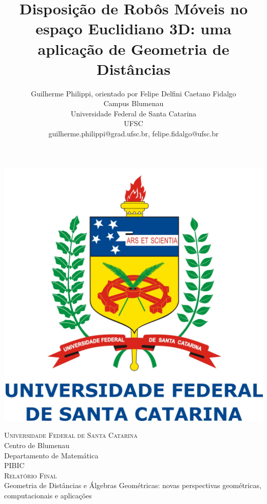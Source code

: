 \documentclass[a4paper,12pt]{article}
\title{Disposição de Robôs Móveis no espaço Euclidiano 3D: uma aplicação de Geometria de Distâncias}
\author{Guilherme Philippi\Mark{*}, orientado por Felipe Delfini Caetano Fidalgo\Mark{\dagger}\\Campus Blumenau\\Universidade Federal de Santa Catarina\\UFSC
	\\guilherme.philippi@grad.ufsc.br\Mark{*}, felipe.fidalgo@ufsc.br\Mark{\dagger}}
\begin{document}
	\begin{titlepage}
		\newcommand{\HRule}{\rule{\linewidth}{0.5mm}} %
		\center %
		\begin{center}
			\includegraphics[scale=0.22]{logoufsc.jpg}
		\end{center}
		\vspace{1cm}
		
		\textsc{\LARGE \hspace{-0.17cm}Universidade Federal de Santa Catarina}\\[0.5cm] %
		{\Large Centro de Blumenau \\ Departamento de Matemática}\\[1.5cm] %
		\textsc{\Large PIBIC \\ Relatório Final \vspace{1.5cm}  \\ }{\large Geometria de Distâncias e Álgebras Geométricas: novas perspectivas geométricas, computacionais e aplicações}\\[2.0cm] %
		

\end{titlepage}
\end{document}
